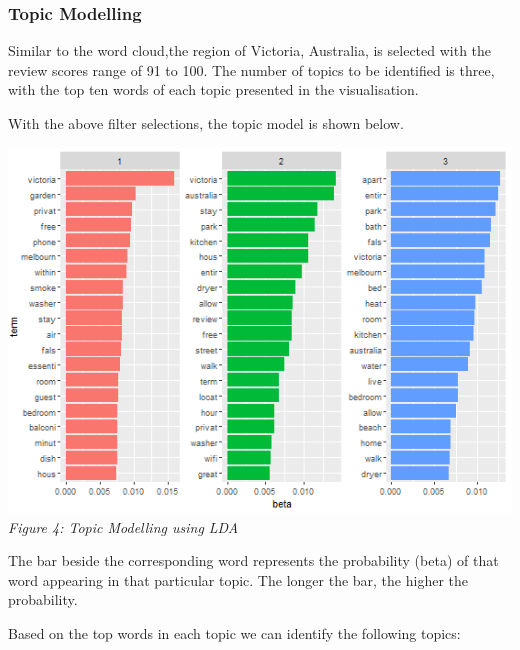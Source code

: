 \documentclass{acm_proc_article-sp}
\begin{document}
\hypertarget{topic-modelling}{%
\subsubsection{Topic Modelling}\label{topic-modelling}}

Similar to the word cloud,the region of Victoria, Australia, is selected
with the review scores range of 91 to 100. The number of topics to be
identified is three, with the top ten words of each topic presented in
the visualisation.

With the above filter selections, the topic model is shown below.

\includegraphics{images/topicmodel2.png} \emph{Figure 4: Topic Modelling
using LDA}

The bar beside the corresponding word represents the probability (beta)
of that word appearing in that particular topic. The longer the bar, the
higher the probability.

Based on the top words in each topic we can identify the following
topics:
\end{document}
